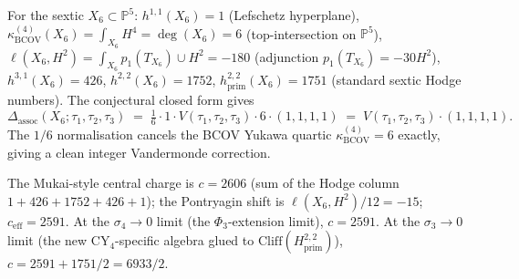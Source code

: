 \begin{example}
\label{ex:sextic-cy4-associator}
For the sextic $X_6 \subset \mathbb{P}^5$:
$h^{1,1}(X_6) = 1$ \textup{(}Lefschetz hyperplane\textup{)},
$\kappa_{\mathrm{BCOV}}^{(4)}(X_6) = \int_{X_6} H^4 = \deg(X_6) = 6$ \textup{(}top-intersection on
$\mathbb{P}^5$\textup{)},
\(\ell(X_6,H^2)=\int_{X_6}p_1(T_{X_6})\cup H^2=-180\)
\textup{(}adjunction \(p_1(T_{X_6})=-30H^2\)\textup{)},
$h^{3,1}(X_6) = 426$, $h^{2,2}(X_6) = 1752$, $h^{2,2}_{\mathrm{prim}}(X_6) = 1751$
\textup{(}standard sextic Hodge numbers\textup{)}. The conjectural closed form gives
\[
 \Delta_{\mathrm{assoc}}(X_6; \tau_1, \tau_2, \tau_3)
 \;=\; \tfrac{1}{6}\cdot 1 \cdot V(\tau_1, \tau_2, \tau_3)\cdot 6 \cdot (1,1,1,1)
 \;=\; V(\tau_1, \tau_2, \tau_3)\cdot (1,1,1,1).
\]
The $1/6$ normalisation cancels the BCOV Yukawa quartic $\kappa_{\mathrm{BCOV}}^{(4)} = 6$ exactly,
giving a clean integer Vandermonde correction.

The Mukai-style central charge is $c = 2606$ \textup{(}sum of the Hodge column $1 +
426 + 1752 + 426 + 1$\textup{)}; the Pontryagin shift is \(\ell(X_6,H^2)/12=-15\);
$c_{\mathrm{eff}} = 2591$. At the $\sigma_4 \to 0$ limit \textup{(}the
$\Phi_3$-extension limit\textup{)}, $c = 2591$. At the $\sigma_3 \to 0$ limit
\textup{(}the new CY${}_4$-specific algebra glued to $\mathrm{Cliff}(H^{2,2}_{\mathrm{prim}})$\textup{)},
$c = 2591 + 1751/2 = 6933/2$.
\end{example}

